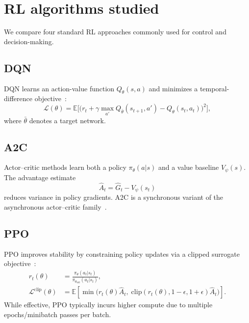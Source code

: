 \documentclass[11pt]{article}
\begin{document}
\section{RL algorithms studied}
We compare four standard RL approaches commonly used for control and decision-making.

\subsection{\textsc{DQN}}
\textsc{DQN} learns an action-value function $Q_\theta(s,a)$ and minimizes a temporal-difference objective~\cite{Mnih2015DQN}:
\begin{equation}
  \mathcal{L}(\theta) = \mathbb{E}\bigl[\bigl(r_t + \gamma \max_{a'}Q_{\bar\theta}(s_{t+1},a') - Q_\theta(s_t,a_t)\bigr)^2\bigr],
\end{equation}
where $\bar\theta$ denotes a target network.

\subsection{\textsc{A2C}}
Actor--critic methods learn both a policy $\pi_\theta(a|s)$ and a value baseline $V_\psi(s)$. The advantage estimate
\begin{equation}
  \hat{A}_t = \hat{G}_t - V_\psi(s_t)
\end{equation}
reduces variance in policy gradients. \textsc{A2C} is a synchronous variant of the asynchronous actor--critic family~\cite{Mnih2016A3C}.

\subsection{\textsc{PPO}}
\textsc{PPO} improves stability by constraining policy updates via a clipped surrogate objective~\cite{Schulman2017PPO}:
\begin{align}
  r_t(\theta) &= \frac{\pi_\theta(a_t|s_t)}{\pi_{\theta_{\text{old}}}(a_t|s_t)},\\
  \mathcal{L}^{\text{clip}}(\theta) &= \mathbb{E}\left[\min\Big(r_t(\theta)\hat{A}_t,\; \mathrm{clip}(r_t(\theta),1{-}\epsilon,1{+}\epsilon)\hat{A}_t\Big)\right].
\end{align}
While effective, PPO typically incurs higher compute due to multiple epochs/minibatch passes per batch.
\end{document}
